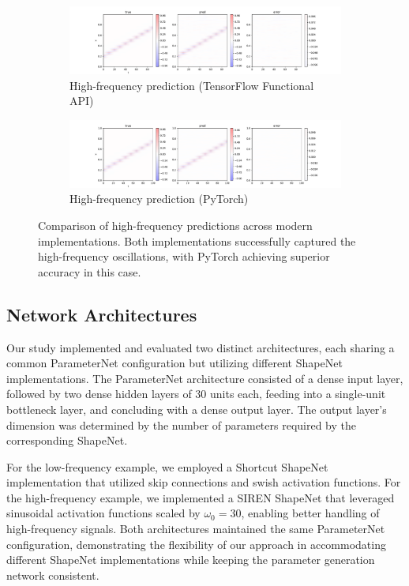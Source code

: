 \documentclass[10pt,journal,compsoc,onecolumn]{IEEEtran}
\begin{document}
\begin{figure}[htbp]
    \centering
    \begin{subfigure}[b]{0.9\textwidth}
        \includegraphics[width=\textwidth]{../../results/functional/high-frequency-adam-20250206-1520-1/vis}
        \caption{High-frequency prediction (TensorFlow Functional API)}
    \end{subfigure}
    \begin{subfigure}[b]{0.9\textwidth}
        \includegraphics[width=\textwidth]{../../results/pytorch/high-frequency-adam-20250206-1607-5/vis}
        \caption{High-frequency prediction (PyTorch)}
    \end{subfigure}
    \caption{Comparison of high-frequency predictions across modern implementations. Both implementations successfully captured the high-frequency oscillations, with PyTorch achieving superior accuracy in this case.}
    \label{fig:high_freq_comparison}
\end{figure}

\subsection{Network Architectures}
Our study implemented and evaluated two distinct architectures, each sharing a common ParameterNet configuration but utilizing different ShapeNet implementations. The ParameterNet architecture consisted of a dense input layer, followed by two dense hidden layers of 30 units each, feeding into a single-unit bottleneck layer, and concluding with a dense output layer. The output layer's dimension was determined by the number of parameters required by the corresponding ShapeNet.

For the low-frequency example, we employed a Shortcut ShapeNet implementation that utilized skip connections and swish activation functions. For the high-frequency example, we implemented a SIREN ShapeNet that leveraged sinusoidal activation functions scaled by $\omega_0 = 30$, enabling better handling of high-frequency signals. Both architectures maintained the same ParameterNet configuration, demonstrating the flexibility of our approach in accommodating different ShapeNet implementations while keeping the parameter generation network consistent.
\end{document}
